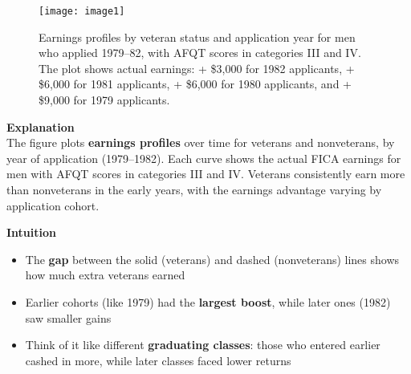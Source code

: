 \documentclass[12pt]{article}
\begin{document}
\begin{figure}[H]
\centering
\texttt{[image: image1]}
\caption*{\footnotesize 
Earnings profiles by veteran status and application year for men who applied 1979--82, 
with AFQT scores in categories III and IV. The plot shows actual earnings: 
+ \$3{,}000 for 1982 applicants, + \$6{,}000 for 1981 applicants, 
+ \$6{,}000 for 1980 applicants, and + \$9{,}000 for 1979 applicants.}
\end{figure}

\doublespacing
\textbf{Explanation} \\
The figure plots \textbf{earnings profiles} over time for veterans and nonveterans, 
by year of application (1979--1982). Each curve shows the actual FICA earnings for men 
with AFQT scores in categories III and IV. Veterans consistently earn more than 
nonveterans in the early years, with the earnings advantage varying by application cohort.

\singlespacing
\textbf{Intuition}
\begin{itemize}
    \item The \textbf{gap} between the solid (veterans) and dashed (nonveterans) lines 
    shows how much extra veterans earned
    \item Earlier cohorts (like 1979) had the \textbf{largest boost}, while later ones (1982) saw smaller gains
    \item Think of it like different \textbf{graduating classes}: those who entered earlier 
    cashed in more, while later classes faced lower returns
\end{itemize}
\end{document}
